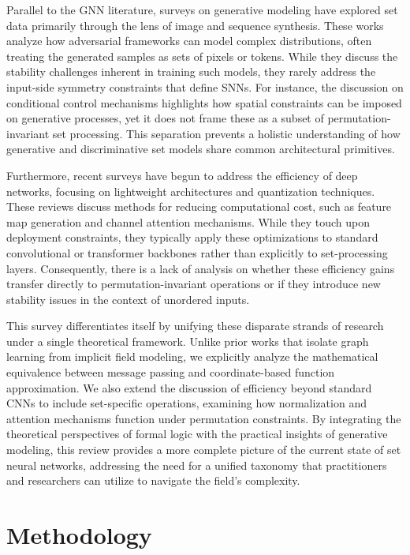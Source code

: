 \documentclass{article}
\begin{document}
Parallel to the GNN literature, surveys on generative modeling have explored set data primarily through the lens of image and sequence synthesis. These works analyze how adversarial frameworks can model complex distributions, often treating the generated samples as sets of pixels or tokens. While they discuss the stability challenges inherent in training such models, they rarely address the input-side symmetry constraints that define SNNs. For instance, the discussion on conditional control mechanisms highlights how spatial constraints can be imposed on generative processes, yet it does not frame these as a subset of permutation-invariant set processing. This separation prevents a holistic understanding of how generative and discriminative set models share common architectural primitives.

Furthermore, recent surveys have begun to address the efficiency of deep networks, focusing on lightweight architectures and quantization techniques. These reviews discuss methods for reducing computational cost, such as feature map generation and channel attention mechanisms. While they touch upon deployment constraints, they typically apply these optimizations to standard convolutional or transformer backbones rather than explicitly to set-processing layers. Consequently, there is a lack of analysis on whether these efficiency gains transfer directly to permutation-invariant operations or if they introduce new stability issues in the context of unordered inputs.

This survey differentiates itself by unifying these disparate strands of research under a single theoretical framework. Unlike prior works that isolate graph learning from implicit field modeling, we explicitly analyze the mathematical equivalence between message passing and coordinate-based function approximation. We also extend the discussion of efficiency beyond standard CNNs to include set-specific operations, examining how normalization and attention mechanisms function under permutation constraints. By integrating the theoretical perspectives of formal logic with the practical insights of generative modeling, this review provides a more complete picture of the current state of set neural networks, addressing the need for a unified taxonomy that practitioners and researchers can utilize to navigate the field's complexity.

\section{Methodology}
\end{document}
